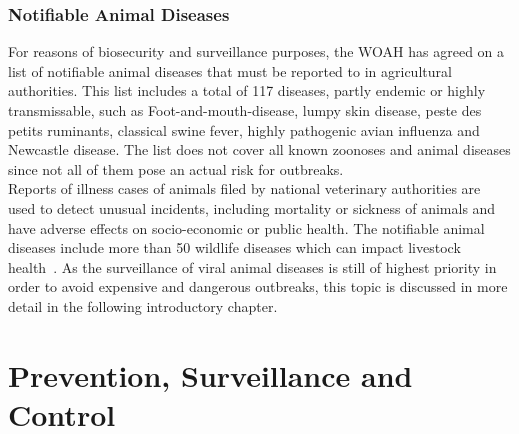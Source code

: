 \subsubsection*{Notifiable Animal Diseases}
For reasons of biosecurity and surveillance purposes, the WOAH has agreed on a list of notifiable animal diseases that must be reported to in agricultural authorities. This list includes a total of 117 diseases, partly endemic or highly transmissable, such as Foot-and-mouth-disease, lumpy skin disease, peste des petits ruminants, classical swine fever, highly pathogenic avian influenza and Newcastle disease. The list does not cover all known zoonoses and animal diseases since not all of them pose an actual risk for outbreaks. \\
Reports of illness cases of animals filed by national veterinary authorities are used to detect unusual incidents, including mortality or sickness of animals and have adverse effects on socio-economic or public health. The notifiable animal diseases include more than 50 wildlife diseases which can impact livestock health~\cite{woah2023list}. As the surveillance of viral animal diseases is still of highest priority in order to avoid expensive and dangerous outbreaks, this topic is discussed in more detail in the following introductory chapter.

\section{Prevention, Surveillance and Control}

